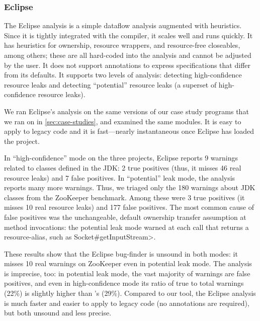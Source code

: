 


\subsubsection{Eclipse}
\label{sec:eclipse}

The Eclipse analysis is a simple dataflow analysis
augmented with heuristics. Since it is tightly integrated with
the compiler, it scales well and runs quickly. It has
heuristics for ownership, resource wrappers, and resource-free
closeables, among others; these are all hard-coded into the analysis and cannot
be adjusted by the user. It does not support annotations to express
specifications that differ from its defaults.
It supports two levels of analysis: detecting high-confidence resource
leaks and detecting ``potential'' resource
leaks (a superset of high-confidence resource leaks).

We ran Eclipse's analysis on the same versions of our case study programs
that we ran \tool on in \cref{sec:case-studies}, and examined
the same modules. It is easy to apply
to legacy code and it is fast---nearly instantaneous once Eclipse
has loaded the project.

In ``high-confidence'' mode on the three projects, Eclipse reports 9
warnings related to classes defined in the JDK:
2 true positives (thus, it misses 46 real resource leaks) and 7
false positives.
In ``potential'' leak mode, the analysis reports many more warnings.
Thus, we triaged only the 180
warnings about JDK classes from the ZooKeeper benchmark.
Among these were 3 true positives (it misses 10 real resource leaks) and 177 false
positives.
The most common cause of false
positives was the unchangeable, default ownership transfer assumption
at method invocations:
the potential leak mode warned at each call that returns a resource-alias, such as
\<Socket\#getInputStream>.

These results show that the Eclipse bug-finder is unsound in both
modes: it misses 10 real warnings on ZooKeeper even in potential leak mode.
The analysis is imprecise, too: in potential leak mode,
the vast majority of warnings are false positives, and even in high-confidence
mode its ratio of true to total warnings
(22\%)
is slightly higher than \tool's
(29\%).
Compared to our tool, the Eclipse analysis
is much faster and easier to apply to legacy code
(no annotations are required), but both unsound
and less precise.

